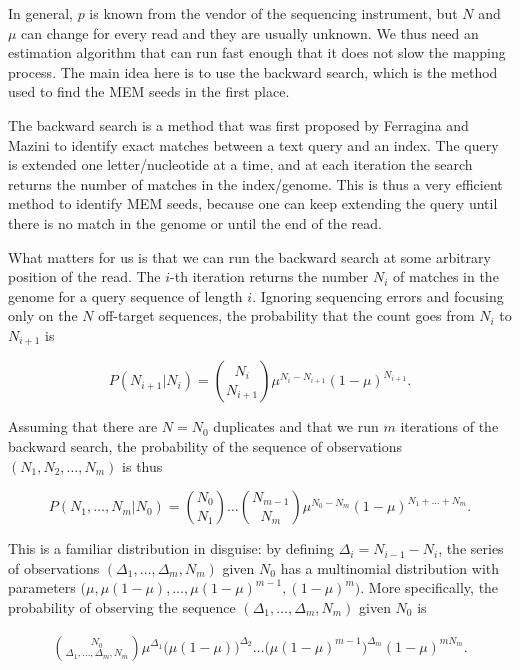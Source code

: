 \documentclass{article}
\begin{document}
In general, $p$ is known from the vendor of the sequencing instrument, but
$N$ and $\mu$ can change for every read and they are usually unknown. We
thus need an estimation algorithm that can run fast enough that it does
not slow the mapping process. The main idea here is to use the backward
search, which is the method used to find the MEM seeds in the first place.

The backward search is a method that was first proposed by Ferragina and
Mazini\cite{ferragina2000opportunistic} to identify exact matches between
a text query and an index. The query is extended one letter/nucleotide at
a time, and at each iteration the search returns the number of matches in
the index/genome. This is thus a very efficient method to identify MEM
seeds, because one can keep extending the query until there is no match in
the genome or until the end of the read.

What matters for us is that we can run the backward search at some
arbitrary position of the read. The $i$-th iteration returns the number
$N_i$ of matches in the genome for a query sequence of length $i$.
Ignoring sequencing errors and focusing only on the $N$ off-target
sequences, the probability that the count goes from $N_i$ to $N_{i+1}$ is

\begin{equation*}
P(N_{i+1}|N_i) = {N_i \choose N_{i+1}}
\mu^{N_i-N_{i+1}}(1-\mu)^{N_{i+1}}.
\end{equation*}

Assuming that there are $N = N_0$ duplicates and that we run $m$
iterations of the backward search, the probability of the sequence of
observations $(N_1, N_2, \ldots, N_m)$ is thus

\begin{equation*}
P(N_1, \ldots, N_m|N_0) = 
{N_0 \choose N_1 } \ldots {N_{m-1} \choose N_m }
\mu^{N_0-N_m}(1-\mu)^{N_1+\ldots+N_m}.
\end{equation*}

This is a familiar distribution in disguise: by defining $\Delta_i =
N_{i-1} - N_i$, the series of observations $(\Delta_1, \ldots, \Delta_m,
N_m)$ given $N_0$ has a multinomial distribution with parameters
$\big(\mu, \mu(1-\mu), \ldots, \mu(1-\mu)^{m-1}, (1-\mu)^m\big)$. More
specifically, the probability of observing the sequence $(\Delta_1,
\ldots, \Delta_m, N_m)$ given $N_0$ is

\begin{align*}
{N_0 \choose \Delta_1, \ldots, \Delta_m, N_m}
\mu^{\Delta_1}\big(\mu(1-\mu)\big)^{\Delta_2}
\ldots \big(\mu(1-\mu)^{m-1}\big)^{\Delta_m}(1-\mu)^{mN_m}.
\end{align*}
\end{document}
